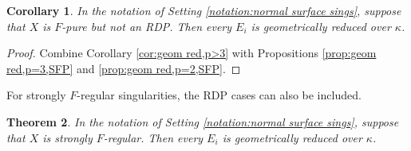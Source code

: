 \documentclass[12pt]{amsart}
\theoremstyle{plain}
\newtheorem{thm}{Theorem}[section]
\newtheorem{cor}[thm]{Corollary}
\theoremstyle{definition}
\theoremstyle{remark}
\newtheorem{defn and notation}[thm]{Definition and Notation}
\theoremstyle{plain}
\numberwithin{equation}{thm}
\begin{document}
\begin{cor}\label{cor:SFP to Geom red}
    In the notation of Setting \ref{notation:normal surface sings}, suppose that $X$ is $F$-pure but not an RDP.
    Then every $E_i$ is geometrically reduced over $\kappa$.
\end{cor}
\begin{proof}
    Combine Corollary \ref{cor:geom red,p>3} with Propositions \ref{prop:geom red,p=3,SFP} and \ref{prop:geom red,p=2,SFP}.
\end{proof}

For strongly $F$-regular singularities, the RDP cases can also be included.

\begin{thm}\label{thm:SFR to Geom.red}
    In the notation of Setting \ref{notation:normal surface sings}, suppose that $X$ is strongly $F$-regular.
    Then every $E_i$ is geometrically reduced over $\kappa$.
\end{thm}
\end{document}

